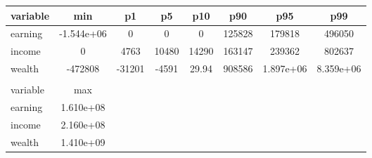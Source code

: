 \documentclass[]{article}
\begin{document}
\begin{tabular}{lccccccc} \hline
variable & min & p1 & p5 & p10 & p90 & p95 & p99 \\ \hline
earning & -1.544e+06 & 0 & 0 & 0 & 125828 & 179818 & 496050 \\
income & 0 & 4763 & 10480 & 14290 & 163147 & 239362 & 802637 \\
wealth & -472808 & -31201 & -4591 & 29.94 & 908586 & 1.897e+06 & 8.359e+06 \\
 &  &  &  &  &  &  &  \\
variable & max &  &  &  &  &  &  \\
earning & 1.610e+08 &  &  &  &  &  &  \\
income & 2.160e+08 &  &  &  &  &  &  \\
 wealth & 1.410e+09 &  &  &  &  &  &  \\ \hline
\end{tabular}
\end{document}
